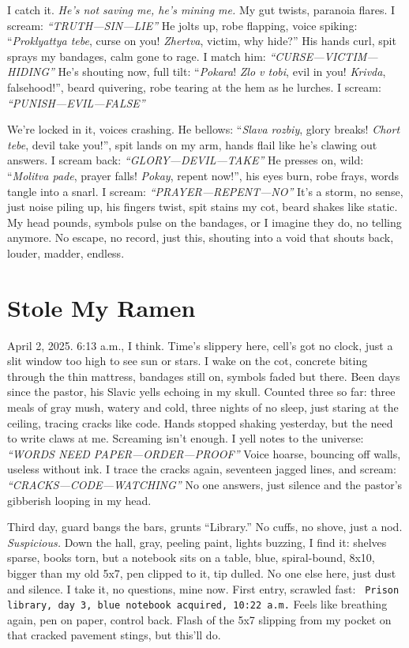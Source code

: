 \documentclass[12pt]{article}
\newcommand{\note}[1]{\texttt{\small \color{DarkGray} #1}}
\begin{document}
I catch it. \textit{He’s not saving me, he’s mining me.} My gut twists, paranoia flares. I scream: \textit{“TRUTH—SIN—LIE”} He jolts up, robe flapping, voice spiking: “\textit{Proklyattya tebe}, curse on you! \textit{Zhertva}, victim, why hide?” His hands curl, spit sprays my bandages, calm gone to rage. I match him: \textit{“CURSE—VICTIM—HIDING”} He’s shouting now, full tilt: “\textit{Pokara}! \textit{Zlo v tobi}, evil in you! \textit{Krivda}, falsehood!”, beard quivering, robe tearing at the hem as he lurches. I scream: \textit{“PUNISH—EVIL—FALSE”}

We’re locked in it, voices crashing. He bellows: “\textit{Slava rozbiy}, glory breaks! \textit{Chort tebe}, devil take you!”, spit lands on my arm, hands flail like he’s clawing out answers. I scream back: \textit{“GLORY—DEVIL—TAKE”} He presses on, wild: “\textit{Molitva pade}, prayer falls! \textit{Pokay}, repent now!”, his eyes burn, robe frays, words tangle into a snarl. I scream: \textit{“PRAYER—REPENT—NO”} It’s a storm, no sense, just noise piling up, his fingers twist, spit stains my cot, beard shakes like static. My head pounds, symbols pulse on the bandages, or I imagine they do, no telling anymore. No escape, no record, just this, shouting into a void that shouts back, louder, madder, endless.

\section{Stole My Ramen}

April 2, 2025. 6:13 a.m., I think. Time’s slippery here, cell’s got no clock, just a slit window too high to see sun or stars. I wake on the cot, concrete biting through the thin mattress, bandages still on, symbols faded but there. Been days since the pastor, his Slavic yells echoing in my skull. Counted three so far: three meals of gray mush, watery and cold, three nights of no sleep, just staring at the ceiling, tracing cracks like code. Hands stopped shaking yesterday, but the need to write claws at me. Screaming isn’t enough. I yell notes to the universe: \textit{“WORDS NEED PAPER—ORDER—PROOF”} Voice hoarse, bouncing off walls, useless without ink. I trace the cracks again, seventeen jagged lines, and scream: \textit{“CRACKS—CODE—WATCHING”} No one answers, just silence and the pastor’s gibberish looping in my head.

Third day, guard bangs the bars, grunts “Library.” No cuffs, no shove, just a nod. \textit{Suspicious.} Down the hall, gray, peeling paint, lights buzzing, I find it: shelves sparse, books torn, but a notebook sits on a table, blue, spiral-bound, 8x10, bigger than my old 5x7, pen clipped to it, tip dulled. No one else here, just dust and silence. I take it, no questions, mine now. First entry, scrawled fast: \note{Prison library, day 3, blue notebook acquired, 10:22 a.m.} Feels like breathing again, pen on paper, control back. Flash of the 5x7 slipping from my pocket on that cracked pavement stings, but this’ll do.
\end{document}
